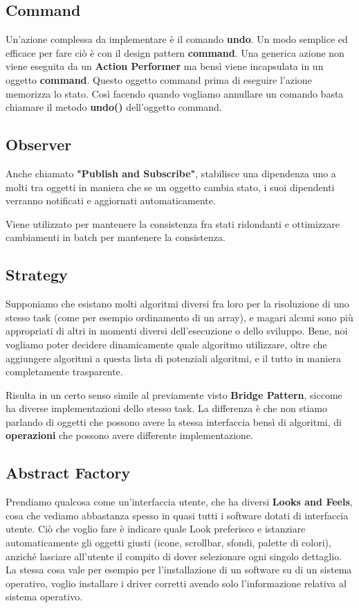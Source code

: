         \subsection{Command}
            Un'azione complessa da implementare è il comando \textbf{undo}. Un modo semplice ed efficace per fare ciò è con il design pattern \textbf{command}. Una generica azione non viene eseguita da un \textbf{Action Performer} ma bensì viene incapsulata in un oggetto \textbf{command}. Questo oggetto command prima di eseguire l'azione memorizza lo stato. Così facendo quando vogliamo annullare un comando basta chiamare il metodo \textbf{undo()} dell'oggetto command.
            
        \subsection{Observer}
            Anche chiamato \textbf{"Publish and Subscribe"}, stabilisce una dipendenza uno a molti tra oggetti in maniera che se un oggetto cambia stato, i suoi dipendenti verranno notificati e aggiornati automaticamente.
            
            Viene utilizzato per mantenere la consistenza fra stati ridondanti e ottimizzare cambiamenti in batch per mantenere la consistenza.
            
        \subsection{Strategy}
            Supponiamo che esistano molti algoritmi diversi fra loro per la risoluzione di uno stesso task (come per esempio ordinamento di un array), e magari alcuni sono più appropriati di altri in momenti diversi dell'esecuzione o dello sviluppo. Bene, noi vogliamo poter decidere dinamicamente quale algoritmo utilizzare, oltre che aggiungere algoritmi a questa lista di potenziali algoritmi, e il tutto in maniera completamente trasparente.
            
            Risulta in un certo senso simile al previamente visto \textbf{Bridge Pattern}, siccome ha diverse implementazioni dello stesso task. La differenza è che non stiamo parlando di oggetti che possono avere la stessa interfaccia bensì di algoritmi, di \textbf{operazioni} che possono avere differente implementazione.
            
        \subsection{Abstract Factory}
            Prendiamo qualcosa come un'interfaccia utente, che ha diversi \textbf{Looks and Feels}, cosa che vediamo abbastanza spesso in quasi tutti i software dotati di interfaccia utente. Ciò che voglio fare è indicare quale Look preferisco e istanziare automaticamente gli oggetti giusti (icone, scrollbar, sfondi, palette di colori), anziché lasciare all'utente il compito di dover selezionare ogni singolo dettaglio. La stessa cosa vale per esempio per l'installazione di un software su di un sistema operativo, voglio installare i driver corretti avendo solo l'informazione relativa al sistema operativo.
            

